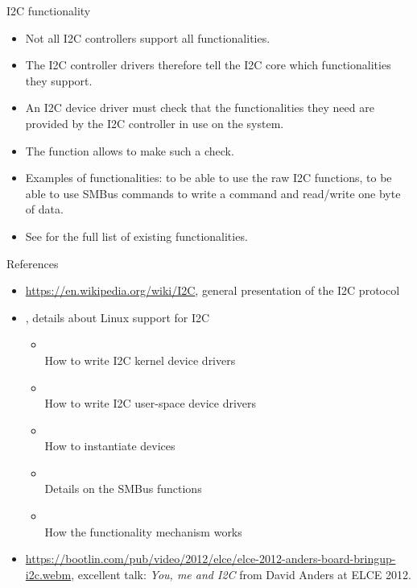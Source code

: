 \begin{frame}{I2C functionality}
  \begin{itemize}
  \item Not all I2C controllers support all functionalities.
  \item The I2C controller drivers therefore tell the I2C core which
    functionalities they support.
  \item An I2C device driver must check that the functionalities they
    need are provided by the I2C controller in use on the system.
  \item The  function allows to make
    such a check.
  \item Examples of functionalities:  to be able to
    use the raw I2C functions,  to be
    able to use SMBus commands to write a command and read/write one
    byte of data.
  \item See  for the full list of
    existing functionalities.
  \end{itemize}
\end{frame}

\begin{frame}{References}
  \begin{itemize}
  \item \url{https://en.wikipedia.org/wiki/I2C}, general presentation
    of the I2C protocol
  \item {}, details about Linux support for I2C
    \begin{itemize}
    \item {}\\
      How to write I2C kernel device drivers
    \item {}\\
      How to write I2C user-space device drivers
    \item {}\\
      How to instantiate devices
    \item {}\\
      Details on the SMBus functions
    \item {}\\
      How the functionality mechanism works
    \end{itemize}
  \item
    \url{https://bootlin.com/pub/video/2012/elce/elce-2012-anders-board-bringup-i2c.webm},
    excellent talk: {\em You, me and I2C} from David Anders at ELCE
    2012.
  \end{itemize}
\end{frame}
